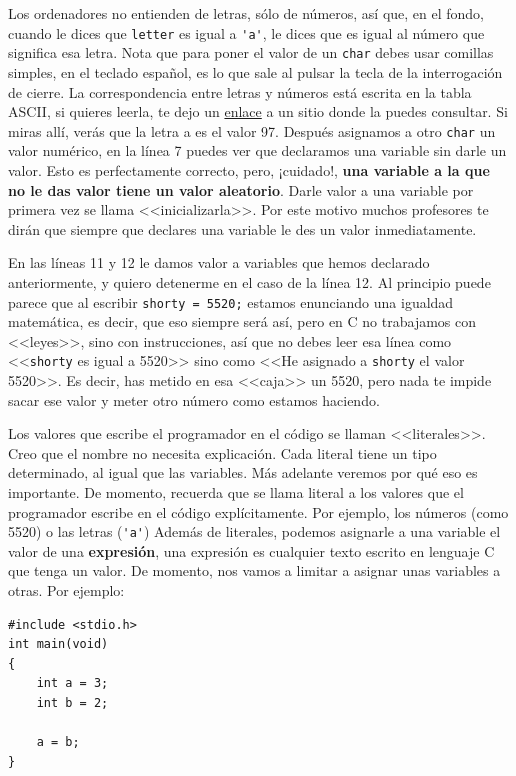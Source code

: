 \documentclass[a4paper]{article}
\begin{document}
Los ordenadores no entienden de letras, sólo de números, así que, en el fondo,
cuando le dices que \verb!letter! es igual a \verb!'a'!, le dices que es igual
al número que significa esa letra. Nota que para poner el valor de un
\texttt{char} debes usar comillas simples, en el teclado español, es lo que
sale al pulsar la tecla de la interrogación de cierre.
La correspondencia entre letras y números está escrita en la tabla ASCII, si
quieres leerla, te dejo un \href{https://elcodigoascii.com.ar/}{enlace}
a un sitio donde la puedes consultar.
Si miras allí, verás que la letra a es el valor
97. Después asignamos a otro \verb!char!
un valor numérico, en la línea 7 puedes ver que declaramos una variable sin
darle un valor. Esto es perfectamente correcto, pero, ¡cuidado!,
\textbf{una variable a la que no le das valor tiene un valor aleatorio}.
Darle valor a una variable por primera vez se llama <<inicializarla>>.
Por este motivo muchos profesores te dirán que siempre que declares
una variable le des un valor inmediatamente.

En las líneas 11 y 12 le damos
valor a variables que hemos declarado anteriormente, y quiero detenerme en el
caso de la línea 12. Al principio puede parece que al escribir
\verb!shorty = 5520;! estamos enunciando una igualdad matemática, es decir,
que eso siempre será así, pero en C no trabajamos con <<leyes>>, sino con
instrucciones, así que no debes leer esa línea como <<\verb!shorty! es igual a
5520>> sino como <<He asignado a \verb!shorty! el valor 5520>>. Es decir, has
metido en esa <<caja>> un 5520, pero nada te impide sacar ese valor y meter
otro número como estamos haciendo.

Los valores que escribe el programador en el código se llaman <<literales>>.
Creo que el nombre no necesita explicación. Cada literal tiene un tipo
determinado, al igual que las variables. Más adelante veremos por qué eso es
importante. De momento, recuerda que se llama literal a los valores que el
programador escribe en el código explícitamente. Por ejemplo, los números
(como 5520) o las letras (\verb!'a'!)
Además de literales, podemos asignarle a una
variable el valor de una \textbf{expresión}, una expresión es cualquier
texto escrito en lenguaje C que tenga un valor. De momento, nos vamos a limitar
a asignar unas variables a otras. Por ejemplo:

\noindent
\begin{minipage}[H]{\linewidth}
\mbox{}
\begin{lstlisting}[style=C, caption={Asignación de variables entre ellas},
label={lst:variableAsignationBetween}]
#include <stdio.h>
int main(void)
{
    int a = 3;
    int b = 2;

    a = b;
}
\end{lstlisting}
\end{minipage}
\end{document}
